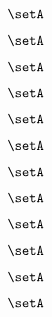 \begin{forslides}
    \begin{equation}
        \label{eq:slides-translation-139}
        \setA
    \end{equation}

    \begin{equation}
        \label{eq:slides-translation-140}
        \setA
    \end{equation}

    \begin{equation}
        \label{eq:slides-translation-141}
        \setA
    \end{equation}

    \begin{equation}
        \label{eq:slides-translation-142}
        \setA
    \end{equation}

    \begin{equation}
        \label{eq:slides-translation-143}
        \setA
    \end{equation}

    \begin{equation}
        \label{eq:slides-translation-144}
        \setA
    \end{equation}

    \begin{equation}
        \label{eq:slides-translation-145}
        \setA
    \end{equation}

    \begin{equation}
        \label{eq:slides-translation-146}
        \setA
    \end{equation}

    \begin{equation}
        \label{eq:slides-translation-147}
        \setA
    \end{equation}

    \begin{equation}
        \label{eq:slides-translation-148}
        \setA
    \end{equation}

    \begin{equation}
        \label{eq:slides-translation-149}
        \setA
    \end{equation}

    \begin{equation}
        \label{eq:slides-translation-150}
        \setA
    \end{equation}


\end{forslides}
